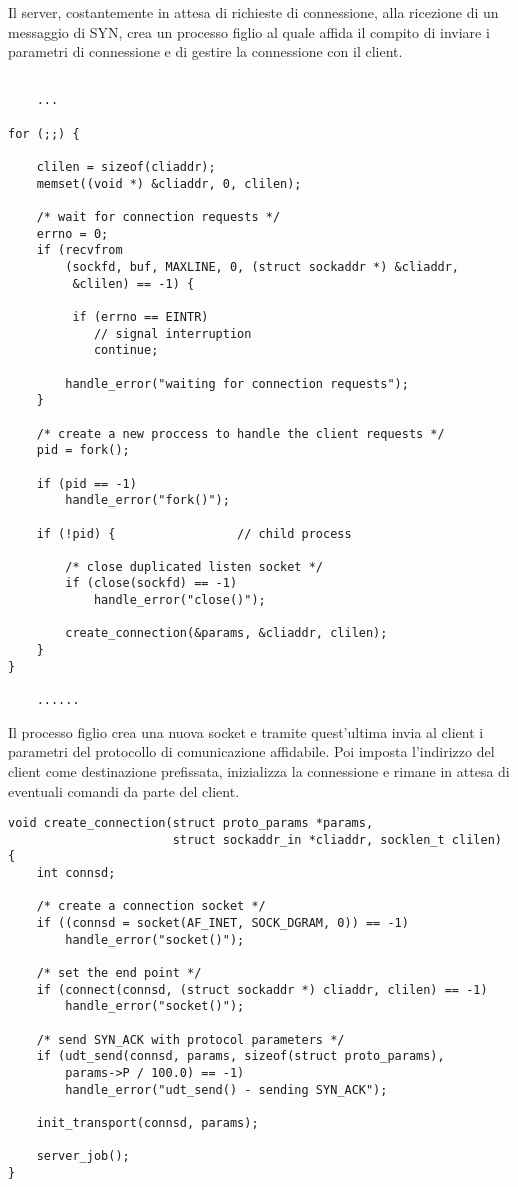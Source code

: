 Il server, costantemente in attesa di richieste di connessione, alla ricezione di un messaggio di SYN, crea un processo figlio al quale affida il compito di inviare i parametri di connessione e di gestire la connessione con il client.

\begin{lstlisting}[title=server: instaurazione della connessione]

	...

for (;;) {

	clilen = sizeof(cliaddr);
	memset((void *) &cliaddr, 0, clilen);

	/* wait for connection requests */
	errno = 0;
	if (recvfrom
		(sockfd, buf, MAXLINE, 0, (struct sockaddr *) &cliaddr,
		 &clilen) == -1) {

		 if (errno == EINTR)
			// signal interruption
			continue;

		handle_error("waiting for connection requests");
	}

	/* create a new proccess to handle the client requests */
	pid = fork();

	if (pid == -1)
		handle_error("fork()");

	if (!pid) {                 // child process

		/* close duplicated listen socket */
		if (close(sockfd) == -1)
			handle_error("close()");

		create_connection(&params, &cliaddr, clilen);
	}
}

	......

\end{lstlisting}


Il processo figlio crea una nuova socket e tramite quest'ultima invia al client i parametri del protocollo di comunicazione affidabile.
Poi imposta l'indirizzo del client come destinazione prefissata, inizializza la connessione e rimane in attesa di eventuali comandi da parte del client.

\begin{lstlisting}[title=connessione del nuovo processo]
void create_connection(struct proto_params *params,
					   struct sockaddr_in *cliaddr, socklen_t clilen)
{
	int connsd;

	/* create a connection socket */
	if ((connsd = socket(AF_INET, SOCK_DGRAM, 0)) == -1)
		handle_error("socket()");

	/* set the end point */
	if (connect(connsd, (struct sockaddr *) cliaddr, clilen) == -1)
		handle_error("socket()");

	/* send SYN_ACK with protocol parameters */
	if (udt_send(connsd, params, sizeof(struct proto_params), 
		params->P / 100.0) == -1)
		handle_error("udt_send() - sending SYN_ACK");

	init_transport(connsd, params);

	server_job();
}
\end{lstlisting}


